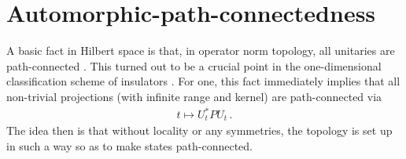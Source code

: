 \documentclass[a4paper,10pt]{article}
\numberwithin{equation}{section}
\theoremstyle{plain}
\newtheorem{thm}{\protect\theoremname}[section]
\theoremstyle{plain}
\newtheorem{lem}[lem]{\protect\lemmaname}
\theoremstyle{plain}
\theoremstyle{plain}
\theoremstyle{plain}
\theoremstyle{remark}
\theoremstyle{definition}
\providecommand{\lemmaname}{Lemma}
\providecommand{\theoremname}{Theorem}
\newcommand{\calA}{\mathcal{A}}
\newcommand{\calN}{\mathcal{N}}
\newcommand{\calS}{\mathcal{S}}
\newcommand{\AM}[1]{\textcolor{cyan}{Anna: [#1]}}
\newcommand{\eq}[1]{\begin{align*}#1\end{align*}}
\begin{document}




    

\section{Automorphic-path-connectedness}
\label{sec:automorphism path connectedness}
A basic fact in Hilbert space is that, in operator norm topology, all unitaries are path-connected \cite{Kuiper1965HomotopyType}. This turned out to be a crucial point in the one-dimensional classification scheme of insulators \cite{ChungShapiro2023}. For one, this fact immediately implies that all non-trivial projections (with infinite range and kernel) are path-connected via \eq{
t\mapsto U_t^\ast P U_t\,.
} The idea then is that without locality or any symmetries, the topology is set up in such a way so as to make states path-connected.
\end{document}
